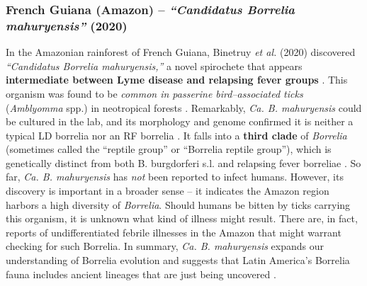 \documentclass[11pt,letterpaper]{article}
\begin{document}
\subsubsection{French Guiana (Amazon) – \textit{“Candidatus Borrelia mahuryensis”} (2020)}
In the Amazonian rainforest of French Guiana, Binetruy \textit{et al.} (2020) discovered \textit{“Candidatus Borrelia mahuryensis,”} a novel spirochete that appears \textbf{intermediate between Lyme disease and relapsing fever groups} \citep{Binetruy2020b}. This organism was found to be \textit{common in passerine bird–associated ticks} (\textit{Amblyomma} spp.) in neotropical forests \citep{Binetruy2020c}. Remarkably, \textit{Ca. B. mahuryensis} could be cultured in the lab, and its morphology and genome confirmed it is neither a typical LD borrelia nor an RF borrelia \citep{Binetruy2020d}. It falls into a \textbf{third clade} of \textit{Borrelia} (sometimes called the “reptile group” or “Borrelia reptile group”), which is genetically distinct from both B. burgdorferi s.l. and relapsing fever borreliae \citep{Binetruy2020e, Binetruy2020f}. So far, \textit{Ca. B. mahuryensis} has \textit{not} been reported to infect humans. However, its discovery is important in a broader sense – it indicates the Amazon region harbors a high diversity of \textit{Borrelia}. Should humans be bitten by ticks carrying this organism, it is unknown what kind of illness might result. There are, in fact, reports of undifferentiated febrile illnesses in the Amazon that might warrant checking for such Borrelia. In summary, \textit{Ca. B. mahuryensis} expands our understanding of Borrelia evolution and suggests that Latin America’s Borrelia fauna includes ancient lineages that are just being uncovered \citep{Binetruy2020g, Binetruy2020h}.
\end{document}
